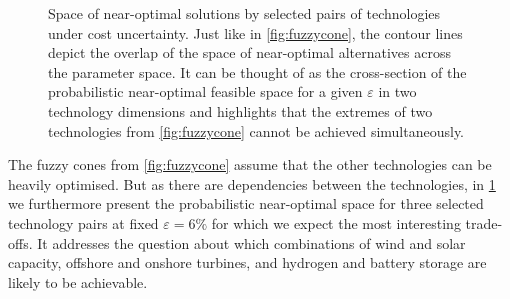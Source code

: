 
\begin{figure}
    \noindent{}
    \caption{
      Space of near-optimal solutions by selected pairs of technologies under cost uncertainty.
    Just like in \cref{fig:fuzzycone}, the contour lines depict the overlap of the space of near-optimal alternatives across the parameter space.
    It can be thought of as the cross-section of the probabilistic near-optimal feasible space for a given $\varepsilon$
    in two technology dimensions and highlights that the extremes of two technologies from \cref{fig:fuzzycone} cannot be achieved simultaneously.
    }
    \label{fig:dependencies}
\end{figure}

The fuzzy cones from \cref{fig:fuzzycone} assume that the other technologies can be heavily optimised.
But as there are dependencies between the technologies, in \cref{fig:dependencies}
we furthermore present the probabilistic near-optimal space for three selected technology
pairs at fixed $\varepsilon=6\%$ for which we expect the most interesting trade-offs.
It addresses the question about which combinations of wind and solar capacity,
offshore and onshore turbines, and hydrogen and battery storage are likely to be achievable.


